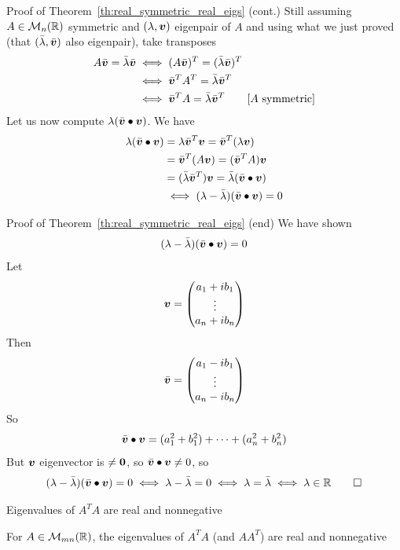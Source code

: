 \documentclass[aspectratio=169]{beamer}\usepackage[]{graphicx}\usepackage[]{xcolor}
\begin{document}
\begin{frame}{Proof of Theorem~\ref{th:real_symmetric_real_eigs} (cont.)}
Still assuming $A\in\mathcal{M}_n(\mathbb{R})$ symmetric and $(\lambda,\bm{v})$ eigenpair of $A$ and using what we just proved (that $(\bar\lambda,\bar{\bm{v}})$ also eigenpair), take transposes
\begin{align*}
A\bar{\bm{v}} = \bar\lambda\bar{\bm{v}} &\iff (A\bar{\bm{v}})^T = (\bar\lambda\bar{\bm{v}})^T \\
&\iff \bar{\bm{v}}^TA^T=\bar\lambda\bar{\bm{v}}^T \\
&\iff \bar{\bm{v}}^T A = \bar\lambda\bar{\bm{v}}^T \qquad{\textrm{[$A$ symmetric]}}
\end{align*}
\vfill
Let us now compute $\lambda (\bar{\bm{v}}\bullet\bm{v})$. We have
\begin{align*}
\lambda (\bar{\bm{v}}\bullet\bm{v}) &= \lambda\bar{\bm{v}}^T\bm{v} = \bar{\bm{v}}^T(\lambda\bm{v}) \\
&= \bar{\bm{v}}^T(A\bm{v}) = (\bar{\bm{v}}^TA)\bm{v} \\
&= (\bar\lambda\bar{\bm{v}}^T)\bm{v} = \bar\lambda(\bar{\bm{v}}\bullet\bm{v}) \\
&\iff (\lambda-\bar\lambda)(\bar{\bm{v}}\bullet\bm{v}) = 0
\end{align*}
\end{frame}

\begin{frame}{Proof of Theorem~\ref{th:real_symmetric_real_eigs} (end)}
We have shown
\[
(\lambda-\bar\lambda)(\bar{\bm{v}}\bullet\bm{v}) = 0
\]
Let 
\[
\bm{v} = \begin{pmatrix}
a_1+ib_1 \\
\vdots \\
a_n+ib_n
\end{pmatrix}
\]
Then
\[
\bar{\bm{v}} = \begin{pmatrix}
a_1-ib_1 \\
\vdots \\
a_n-ib_n
\end{pmatrix}
\]
So
\[
\bar{\bm{v}}\bullet\bm{v} = (a_1^2+b_1^2)+\cdots+(a_n^2+b_n^2)
\]
But $\bm{v}$ eigenvector is $\neq\b0$, so $\bar{\bm{v}}\bullet\bm{v}\neq 0$, so
\[
(\lambda-\bar\lambda)(\bar{\bm{v}}\bullet\bm{v}) = 0
\iff \lambda-\bar\lambda=0
\iff \lambda=\bar\lambda\iff \lambda\in\mathbb{R}\qed
\]
\end{frame}


\begin{frame}{Eigenvalues of $A^TA$ are real and nonnegative}
\begin{importanttheorem}\label{th:eigenvalues_ATA_nonnegative}
For $A\in\mathcal{M}_{mn}(\mathbb{R})$, the eigenvalues of $A^TA$ (and $AA^T$) are real and nonnegative
\end{importanttheorem}
\end{frame}
\end{document}
